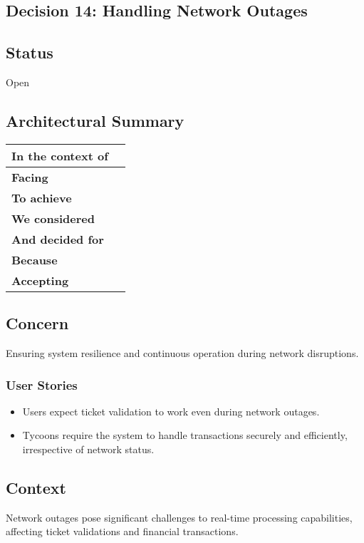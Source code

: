 \subsection{Decision 14: Handling Network Outages}

\subsection*{Status}
Open


\subsection*{Architectural Summary}
\begin{tabular}{|p{3.5cm}|p{10.5cm}|}
    \hline
    \textbf{In the context of} &  \\
    \hline
    \textbf{Facing} &  \\
    \hline
    \textbf{To achieve} & \\
    \hline
    \textbf{We considered} & \\
    \hline
    \textbf{And decided for} & \\
    \hline
    \textbf{Because} &  \\
    \hline
    \textbf{Accepting} &  \\
    \hline
\end{tabular}

\subsection*{Concern}
Ensuring system resilience and continuous operation during network disruptions.
\subsubsection*{User Stories}
\begin{itemize}
    \item Users expect ticket validation to work even during network outages.
    \item Tycoons require the system to handle transactions securely and efficiently, irrespective of network status.
\end{itemize}

\subsection*{Context}
Network outages pose significant challenges to real-time processing capabilities, affecting ticket validations and financial transactions.

